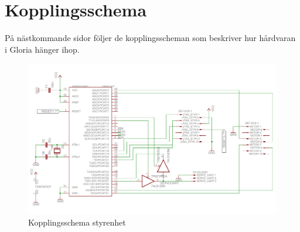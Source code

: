 \section{Kopplingsschema}

På nästkommande sidor följer de kopplingsscheman som beskriver hur hårdvaran i Gloria hänger ihop.

\begin{figure}[h!]
	\centering
	\includegraphics[scale=0.55,angle=90]{grafik/kopplingsschema-drive_unit}
	\caption{Kopplingsschema styrenhet} \label{kopplingsschema-styrenhet}
\end{figure}

